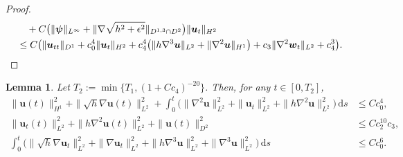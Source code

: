 \documentclass[11pt,reqno]{amsart}
\newtheorem{lem}{Lemma}[section]
\numberwithin{rk}{section}
\numberwithin{prop}{section}
\numberwithin{mydef}{section}
\numberwithin{lem}{section}
\numberwithin{equation}{section}
\numberwithin{thm}{section}
\begin{document}
\begin{proof}
\begin{align}
\begin{aligned}
&\quad +C\big(\|\boldsymbol{\psi}\|_{L^\infty}+\|\nabla \sqrt{h^2+\epsilon^2}\|_{D^{1,3}\cap D^2}\big)\|\boldsymbol{u}_t\|_{H^2} \notag\\
&\leq  C\big(\|\boldsymbol{u}_{tt}\|_{D^1 }+c_0^4\|\boldsymbol{u}_t\|_{H^2}+c_4^4\big(\|h\nabla^3 \boldsymbol{u}\|_{L^2} +\|\nabla^2 \boldsymbol{u}\|_{H^1} \big)+c_3\|\nabla^2 \boldsymbol{w}_t\|_{L^2}+c_4^3\big).\notag
\end{aligned}
\end{align}
\end{proof}



\begin{lem}\label{lu}
Let $T_2:=\min\{T_1,(1+Cc_4)^{-20}\}$.
Then, for any $t\in [0, T_2]$, 
\begin{equation*} 
\begin{aligned}
\|\boldsymbol{u}(t)\|_{H^1}^2+\|\sqrt{h}\nabla \boldsymbol{u}(t)\|^2_{L^2}  +\int^t_0\big(\|\nabla^2\boldsymbol{u}\|^2_{L^2}+\|\boldsymbol{u}_t\|^2_{L^2}+\|h\nabla^2\boldsymbol{u}\|^2_{L^2}\big)\,\mathrm{d}s
&\leq Cc^4_0,\\
\|\boldsymbol{u}_t(t)\|_{L^2}^2+
 \|h\nabla^2 \boldsymbol{u}(t)\|^2_{L^2}+ \|\boldsymbol{u}(t)\|^2_{D^2}&\leq Cc_2^{10}c_3,\\
\int_0^t \big(\|\sqrt{h}\nabla \boldsymbol{u}_t\|^2_{L^2}+\|\nabla \boldsymbol{u}_t\|^2_{L^2}+\|h\nabla^3\boldsymbol{u}\|^2_{L^2}+ \|\nabla^3\boldsymbol{u}\|^2_{L^2}\big)\,\mathrm{d}s
&\leq  Cc^6_0.
\end{aligned}
\end{equation*}
\end{lem}
\end{document}
